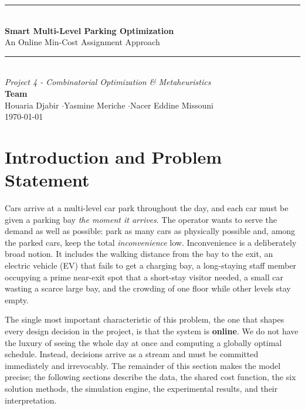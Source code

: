\documentclass[11pt,a4paper]{article}
\begin{document}
\begin{titlepage}
\centering
\vspace*{2.5cm}
{\color{accent}\rule{\textwidth}{1.5pt}}\\[0.6cm]
{\Huge\bfseries Smart Multi-Level Parking Optimization}\\[0.5cm]
{\Large An Online Min-Cost Assignment Approach}\\[0.3cm]
{\color{accent}\rule{\textwidth}{1.5pt}}\\[1.4cm]

{\large\itshape Project 4 - Combinatorial Optimization \& Metaheuristics}\\[2.5cm]

{\large\bfseries Team}\\[0.4cm]
{\large Houaria Djabir \quad$\cdot$\quad Yasmine Meriche \quad$\cdot$\quad Nacer Eddine Missouni}\\[3cm]

{\large\today}
\vfill
\end{titlepage}

\tableofcontents
\thispagestyle{fancy}
\newpage

\section{Introduction and Problem Statement}

Cars arrive at a multi-level car park throughout the day, and each car must be
given a parking bay \emph{the moment it arrives}. The operator wants to serve the
demand as well as possible: park as many cars as physically possible and, among the
parked cars, keep the total \emph{inconvenience} low. Inconvenience is a deliberately
broad notion. It includes the walking distance from the bay to the exit, an electric
vehicle (EV) that fails to get a charging bay, a long-staying staff member occupying
a prime near-exit spot that a short-stay visitor needed, a small car wasting a scarce
large bay, and the crowding of one floor while other levels stay empty.

The single most important characteristic of this problem, the one that shapes every
design decision in the project, is that the system is \textbf{online}. We do not have
the luxury of seeing the whole day at once and computing a globally optimal schedule.
Instead, decisions arrive as a stream and must be committed immediately and
irrevocably. The remainder of this section makes the model precise; the following
sections describe the data, the shared cost function, the six solution methods, the
simulation engine, the experimental results, and their interpretation.
\end{document}
